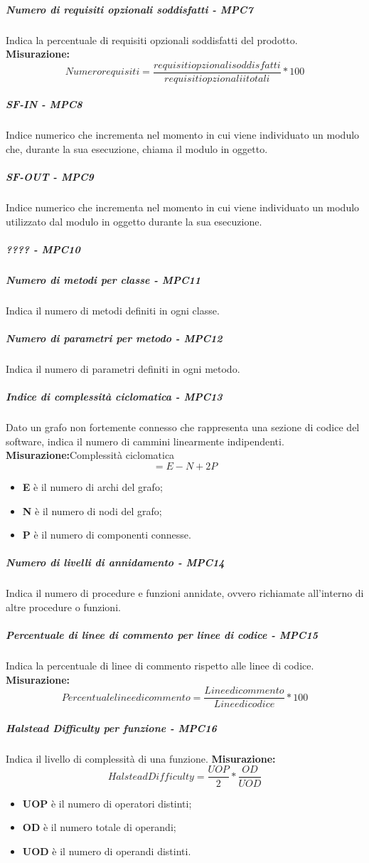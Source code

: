 \subparagraph{Numero di requisiti opzionali soddisfatti - MPC7}
Indica la percentuale di requisiti opzionali soddisfatti del prodotto.
\textbf{Misurazione:}\begin{equation}
Numero requisiti = \frac{requisiti opzionali soddisfatti}{requisiti opzionalii totali} * 100
\end{equation}
\subparagraph{SF-IN - MPC8}
Indice numerico che incrementa nel momento in cui viene individuato un modulo che, durante la sua esecuzione, chiama il modulo in oggetto.
\subparagraph{SF-OUT - MPC9}
Indice numerico che incrementa nel momento in cui viene individuato un modulo utilizzato dal modulo in oggetto durante la sua esecuzione.
\subparagraph{???? - MPC10}

\subparagraph{Numero di metodi per classe - MPC11}
Indica il numero di metodi definiti in ogni classe.
\subparagraph{Numero di parametri per metodo - MPC12}
Indica il numero di parametri definiti in ogni metodo.
\subparagraph{Indice di complessità ciclomatica - MPC13}
Dato un grafo non fortemente connesso che rappresenta una sezione di codice del software, indica il numero di cammini linearmente indipendenti.
\textbf{Misurazione:}Complessità ciclomatica
\begin{equation}
 = E - N + 2P
\end{equation}
\begin{itemize}
	\item \textbf{E} è il numero di archi del grafo;
	\item \textbf{N} è il numero di nodi del grafo;
	\item \textbf{P} è il numero di componenti connesse.
\end{itemize}
\subparagraph{Numero di livelli di annidamento - MPC14}
Indica il numero di procedure e funzioni annidate, ovvero richiamate all'interno di altre procedure o funzioni.
\subparagraph{Percentuale di linee di commento per linee di codice - MPC15}
Indica la percentuale di linee di commento rispetto alle linee di codice.
\textbf{Misurazione:}\begin{equation}
Percentuale linee di commento = \frac{Linee di commento}{Linee di codice} * 100
\end{equation}
\subparagraph{Halstead Difficulty per funzione - MPC16}
Indica il livello di complessità di una funzione.
\textbf{Misurazione:}\begin{equation}
Halstead Difficulty = \frac{UOP}{2} * \frac{OD}{UOD}
\end{equation}	
\begin{itemize}
	\item \textbf{UOP} è il numero di operatori distinti;
	\item \textbf{OD} è il numero totale di operandi;
	\item \textbf{UOD} è il numero di operandi distinti.
\end{itemize}
